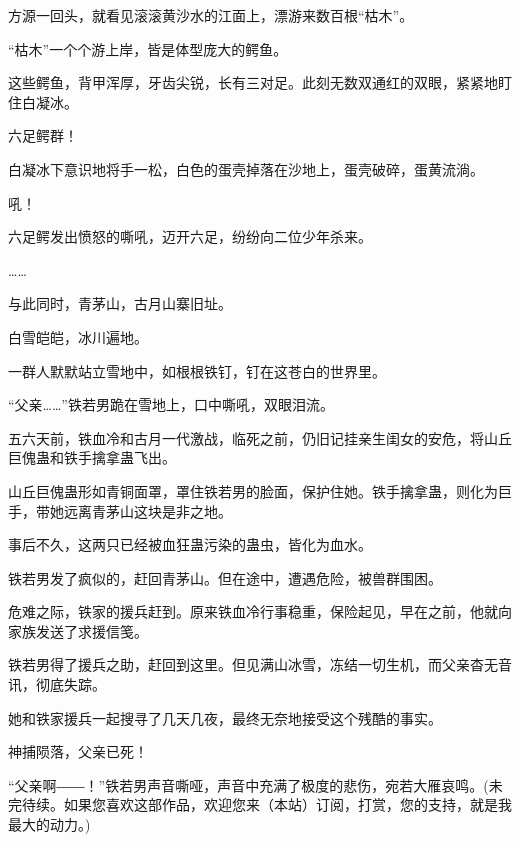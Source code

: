 \begin{this_body}
方源一回头，就看见滚滚黄沙水的江面上，漂游来数百根“枯木”。

“枯木”一个个游上岸，皆是体型庞大的鳄鱼。

这些鳄鱼，背甲浑厚，牙齿尖锐，长有三对足。此刻无数双通红的双眼，紧紧地盯住白凝冰。

六足鳄群！

白凝冰下意识地将手一松，白色的蛋壳掉落在沙地上，蛋壳破碎，蛋黄流淌。

吼！

六足鳄发出愤怒的嘶吼，迈开六足，纷纷向二位少年杀来。

……

与此同时，青茅山，古月山寨旧址。

白雪皑皑，冰川遍地。

一群人默默站立雪地中，如根根铁钉，钉在这苍白的世界里。

“父亲……”铁若男跪在雪地上，口中嘶吼，双眼泪流。

五六天前，铁血冷和古月一代激战，临死之前，仍旧记挂亲生闺女的安危，将山丘巨傀蛊和铁手擒拿蛊飞出。

山丘巨傀蛊形如青铜面罩，罩住铁若男的脸面，保护住她。铁手擒拿蛊，则化为巨手，带她远离青茅山这块是非之地。

事后不久，这两只已经被血狂蛊污染的蛊虫，皆化为血水。

铁若男发了疯似的，赶回青茅山。但在途中，遭遇危险，被兽群围困。

危难之际，铁家的援兵赶到。原来铁血冷行事稳重，保险起见，早在之前，他就向家族发送了求援信笺。

铁若男得了援兵之助，赶回到这里。但见满山冰雪，冻结一切生机，而父亲杳无音讯，彻底失踪。

她和铁家援兵一起搜寻了几天几夜，最终无奈地接受这个残酷的事实。

神捕陨落，父亲已死！

“父亲啊――！”铁若男声音嘶哑，声音中充满了极度的悲伤，宛若大雁哀鸣。(未完待续。如果您喜欢这部作品，欢迎您来（本站）订阅，打赏，您的支持，就是我最大的动力。)

\end{this_body}

